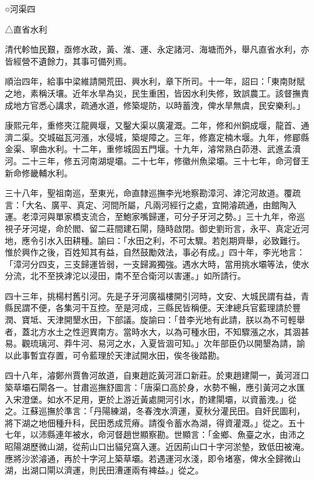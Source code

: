 
\begin{pinyinscope}
○河渠四

△直省水利

清代軫恤民艱，亟修水政，黃、淮、運、永定諸河、海塘而外，舉凡直省水利，亦皆經營不遺餘力，其事可備列焉。

順治四年，給事中梁維請開荒田、興水利，章下所司。十一年，詔曰：「東南財賦之地，素稱沃壤。近年水旱為災，民生重困，皆因水利失修，致誤農工。該督撫責成地方官悉心講求，疏通水道，修築堤防，以時蓄洩，俾水旱無虞，民安樂利。」

康熙元年，重修夾江龍興堰，又鑿大渠以廣灌溉。二年，修和州銅成堰，龍首、通濟二渠。交城磁瓦河漲，水侵城，築堤障之。三年，修嘉定楠木堰。九年，修郿縣金渠、寧曲水利。十二年，重修城固五門堰。十九年，濬常熟白茆港、武進孟瀆河。二十三年，修五河南湖堤壩。二十七年，修徽州魚梁壩。三十七年，命河督王新命修畿輔水利。

三十八年，聖祖南巡，至東光，命直隸巡撫李光地察勘漳河、滹沱河故道。覆疏言：「大名、廣平、真定、河間所屬，凡兩河經行之處，宜開濬疏通，由館陶入運。老漳河與單家橋支流合，至鮑家嘴歸運，可分子牙河之勢。」三十九年，帝巡視子牙河堤，命於閻、留二莊間建石閘，隨時啟閉。御史劉珩言，永平、真定近河地，應令引水入田耕種。諭曰：「水田之利，不可太驟。若剋期齊舉，必致難行。惟於興作之後，百姓知其有益，自然鼓勵效法，事必有成。」四十年，李光地言：「漳河分四支，三支歸運皆弱，一支歸澱獨強。遇水大時，當用挑水壩等法，使水分流，北不至挾滹沱以浸田，南不至合衛河以害運。」如所請行。

四十三年，挑楊村舊引河。先是子牙河廣福樓開引河時，文安、大城民謂有益，青縣民謂不便，各集河干互控。至是河成，三縣民皆稱便。天津總兵官藍理請於豐潤、寶坻、天津開墾水田，下部議。旋諭曰：「昔李光地有此請，朕以為不可輕舉者，蓋北方水土之性迥異南方。當時水大，以為可種水田，不知驟漲之水，其涸甚易。觀琉璃河、莽牛河、易河之水，入夏皆涸可知。」次年部臣仍以開墾為請，諭以此事暫宜存置，可令藍理於天津試開水田，俟冬後踏勘。

四十八年，濬鄭州賈魯河故道，自東趙訖黃河涯口新莊。於東趙建閘一，黃河涯口築草壩石閘各一。甘肅巡撫舒圖言：「唐渠口高於身，水勢不暢，應引黃河之水匯入宋澄堡。如水不足用，更於上游近黃處開河引水，酌建閘壩，以資蓄洩。」從之。江蘇巡撫於準言：「丹陽練湖，冬春洩水濟運，夏秋分灌民田。自奸民圖利，將下湖之地佃種升科，民田悉成荒瘠。請復令蓄水為湖，得資灌溉。」從之。五十七年，以沛縣連年被水，命河督趙世顯察勘。世顯言：「金鄉、魚臺之水，由沛之昭陽湖歷微山湖，從荊山口出貓兒窩入運。近因荊山口十字河淤墊，致低田被淹。應將沙淤濬通，再於十字河上築草壩。若遇運河水淺，即令堵塞，俾水全歸微山湖，出湖口閘以濟運，則民田漕運兩有裨益。」從之。


\end{pinyinscope}
